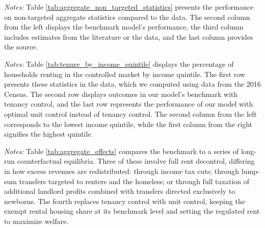 \documentclass[parskip=full]{article}
\newenvironment{fignote2}[1]
{
\par
\medskip
\begin{minipage}{#1}
\footnotesize
}
{
\end{minipage}
}
\begin{document}
\begin{table}[H]
    \centering
    \caption{Aggregate non-targeted statistics}
    \vspace{-0.5cm}
    \label{tab:aggregate_non_targeted_statistics}  
    \vspace{-0.45cm}
    \begin{fignote2}{0.84\textwidth}
      \textit{Notes:} Table \ref{tab:aggregate_non_targeted_statistics} presents the performance on non-targeted aggregate statistics compared to the data. The second column from the left displays the benchmark model's performance, the third column includes estimates from the literature or the data, and the last column provides the source.
    \end{fignote2}
\end{table}

\begin{table}[H]
    \centering
    \caption{Households in controlled market by income quintile (all households)}
    \vspace{-0.5cm}
    \label{tab:tenure_by_income_quintile}     
    \vspace{-0.45cm}
    \begin{fignote2}{0.81\textwidth}
    \textit{Notes:} Table \ref{tab:tenure_by_income_quintile} displays the percentage of households renting in the controlled market by income quintile. The first row presents these statistics in the data, which we computed using data from the 2016 Census. The second row displays outcomes in our model's benchmark with tenancy control, and the last row represents the performance of our model with optimal unit control instead of tenancy control. The second column from the left corresponds to the lowest income quintile, while the first column from the right signifies the highest quintile. 
    \end{fignote2}
\end{table}

\begin{table}[H]
    \centering
    \caption{Aggregate effects generated by changes in rent-control policy}
    \vspace{-0.5cm}
    \label{tab:aggregate_effects}
    
    \vspace{-0.45cm}
    \begin{fignote2}{1.00\textwidth}
    \textit{Notes:} Table \ref{tab:aggregate_effects} compares the benchmark to a series of long-run counterfactual equilibria. Three of these involve full rent decontrol, differing in how excess revenues are redistributed: through income tax cuts; through lump-sum transfers targeted to renters and the homeless; or through full taxation of additional landlord profits combined with transfers directed exclusively to newborns. The fourth replaces tenancy control with unit control, keeping the exempt rental housing share at its benchmark level and setting the regulated rent to maximize welfare.
    \end{fignote2}
\end{table}
\end{document}
